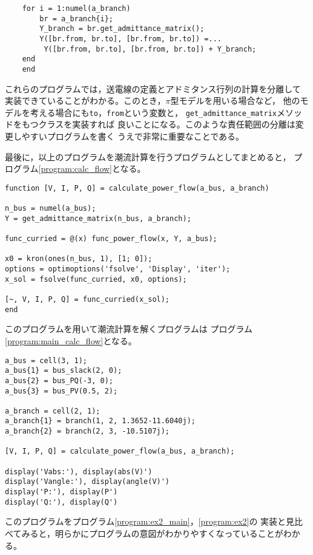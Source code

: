 {\begin{例}[より良い実装]
\begin{PROGRAMA}[count,title={get\_admittance\_matrix.m}]
\begin{verbatim}
    for i = 1:numel(a_branch)
        br = a_branch{i};
        Y_branch = br.get_admittance_matrix();
        Y([br.from, br.to], [br.from, br.to]) =...
         Y([br.from, br.to], [br.from, br.to]) + Y_branch;
    end
    end
\end{verbatim}
\end{PROGRAMA}
これらのプログラムでは，送電線の定義とアドミタンス行列の計算を分離して
実装できていることがわかる。このとき，$\pi$型モデルを用いる場合など，
他のモデルを考える場合にも\verb|to|，\verb|from|という変数と，
\verb|get_admittance_matrix|メソッドをもつクラスを実装すれば
良いことになる。このような責任範囲の分離は変更しやすいプログラムを書く
うえで非常に重要なことである。

最後に，以上のプログラムを潮流計算を行うプログラムとしてまとめると，
プログラム\ref{program:calc_flow}となる。
\begin{PROGRAMA}[count,title={calculate\_power\_flow.m}]\label{program:calc_flow}
\begin{verbatim}
function [V, I, P, Q] = calculate_power_flow(a_bus, a_branch)

n_bus = numel(a_bus);
Y = get_admittance_matrix(n_bus, a_branch);

func_curried = @(x) func_power_flow(x, Y, a_bus);

x0 = kron(ones(n_bus, 1), [1; 0]);
options = optimoptions('fsolve', 'Display', 'iter');
x_sol = fsolve(func_curried, x0, options);

[~, V, I, P, Q] = func_curried(x_sol);
end
\end{verbatim}
\end{PROGRAMA}

このプログラムを用いて潮流計算を解くプログラムは
プログラム\ref{program:main_calc_flow}となる。
\begin{PROGRAMA}[count,title={main\_power\_flow.m}]\label{program:main_calc_flow}
\begin{verbatim}
a_bus = cell(3, 1);
a_bus{1} = bus_slack(2, 0);
a_bus{2} = bus_PQ(-3, 0);
a_bus{3} = bus_PV(0.5, 2);

a_branch = cell(2, 1);
a_branch{1} = branch(1, 2, 1.3652-11.6040j);
a_branch{2} = branch(2, 3, -10.5107j);

[V, I, P, Q] = calculate_power_flow(a_bus, a_branch);

display('Vabs:'), display(abs(V)')
display('Vangle:'), display(angle(V)')
display('P:'), display(P')
display('Q:'), display(Q')
\end{verbatim}
\end{PROGRAMA}

このプログラムをプログラム\ref{program:ex2_main}，\ref{program:ex2}の
実装と見比べてみると，明らかにプログラムの意図がわかりやすくなっていることがわかる。
\end{例}
}
